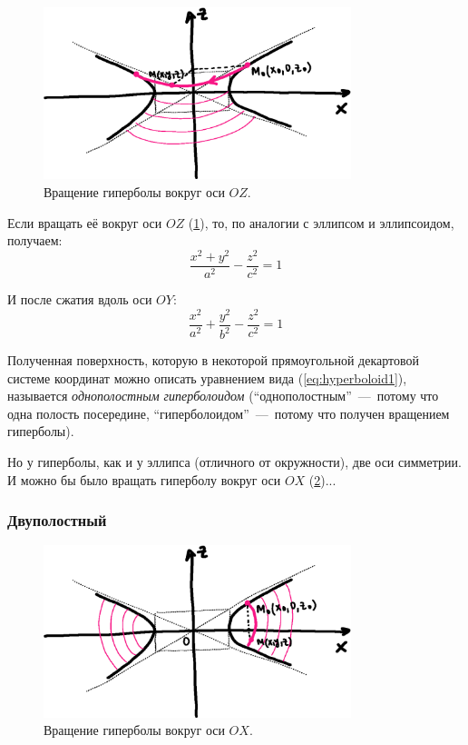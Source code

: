 \documentclass[a4paper,12pt]{article}
\begin{document}
  \begin{figure}[h]
    \centering

    \includegraphics[width=0.8\textwidth]{hyperbola-rotate-1}
  
    \caption{Вращение гиперболы вокруг оси $OZ$.}
    \label{fig:hyperbola-rotate-1}
  \end{figure}
  
  Если вращать её вокруг оси $OZ$ (\ref{fig:hyperbola-rotate-1}), то, по аналогии с эллипсом и эллипсоидом, получаем:
  \[
    \frac{x^2 + y^2}{a^2} - \frac{z^2}{c^2} = 1
  \]
  
  И после сжатия вдоль оси $OY$:
  \begin{equation}
    \label{eq:hyperboloid1}
    \boxed{
      \frac{x^2}{a^2} + \frac{y^2}{b^2} - \frac{z^2}{c^2} = 1
    }
  \end{equation}
  
  Полученная поверхность, которую в некоторой прямоугольной декартовой системе координат можно описать уравнением вида (\ref{eq:hyperboloid1}), называется \emph{однополостным гиперболоидом} (``однополостным''~---~потому что одна полость посередине, ``гиперболоидом''~---~потому что получен вращением гиперболы).
  
  Но у гиперболы, как и у эллипса (отличного от окружности), две оси симметрии.
  И можно бы было вращать гиперболу вокруг оси $OX$ (\ref{fig:hyperbola-rotate-2})...
  
  
  \subsubsection{Двуполостный}
  
  \begin{figure}[h]
    \centering

    \includegraphics[width=0.8\textwidth]{hyperbola-rotate-2}
  
    \caption{Вращение гиперболы вокруг оси $OX$.}
    \label{fig:hyperbola-rotate-2}
  \end{figure}
  
\end{document}
